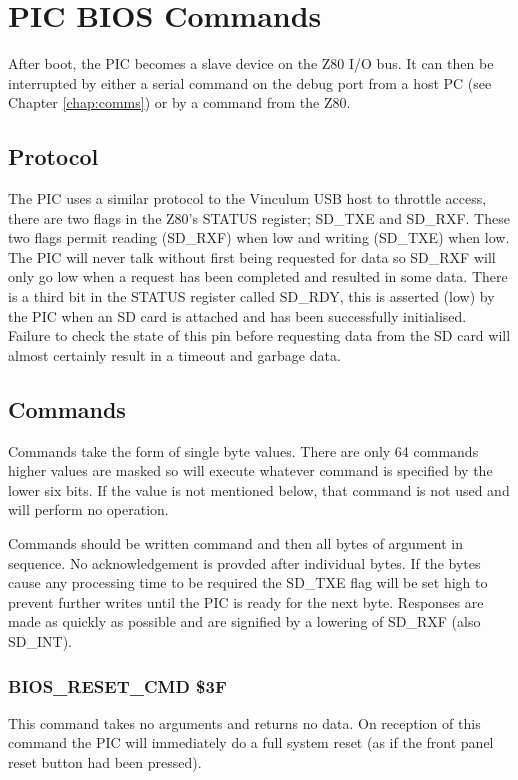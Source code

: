 \chapter{PIC BIOS Commands}
After boot, the PIC becomes a slave device on the Z80 I/O bus.  It can then be
interrupted by either a serial command on the debug port from a host PC (see
Chapter \ref{chap:comms}) or by a command from the Z80.

\section{Protocol}
The PIC uses a similar protocol to the Vinculum USB host to throttle access,
there are two flags in the Z80's STATUS register; SD\_TXE and SD\_RXF.  These
two flags permit reading (SD\_RXF) when low and writing (SD\_TXE) when low.  The
PIC will never talk without first being requested for data so SD\_RXF will only
go low when a request has been completed and resulted in some data.  There is a
third bit in the STATUS register called SD\_RDY, this is asserted (low) by the
PIC when an SD card is attached and has been successfully initialised.  Failure
to check the state of this pin before requesting data from the SD card will
almost certainly result in a timeout and garbage data.

\section{Commands}
Commands take the form of single byte values.  There are only 64 commands higher
values are masked so will execute whatever command is specified by the lower six
bits.  If the value is not mentioned below, that command is not used and will
perform no operation.

Commands should be written command and then all bytes of argument in sequence.
No acknowledgement is provded after individual bytes.  If the bytes cause any
processing time to be required the SD\_TXE flag will be set high to prevent
further writes until the PIC is ready for the next byte.  Responses are made as
quickly as possible and are signified by a lowering of SD\_RXF (also SD\_INT).

\subsection{BIOS\_RESET\_CMD \$3F}
This command takes no arguments and returns no data.  On reception of this
command the PIC will immediately do a full system reset (as if the front panel
reset button had been pressed).

